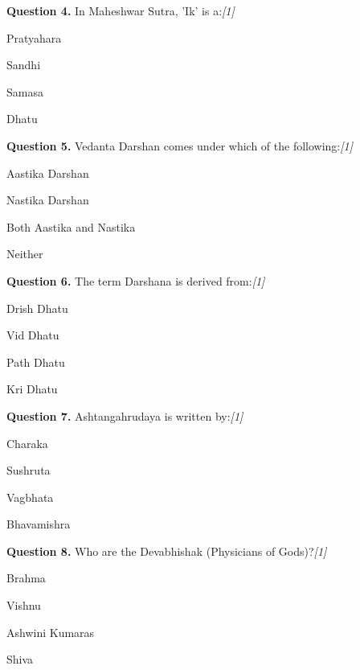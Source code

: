 \documentclass[11pt,a4paper]{article}
\newcommand{\pts}[1]{\hfill   \textit{[#1]}}
\begin{document}
\medskip




\noindent   \textbf{Question 4.} In Maheshwar Sutra, 'Ik' is a:\pts{1}

\begin{parts}
  \item Pratyahara
  \item Sandhi
  \item Samasa
  \item Dhatu
\end{parts}

\medskip




\noindent   \textbf{Question 5.} Vedanta Darshan comes under which of the following:\pts{1}

\begin{parts}
  \item Aastika Darshan
  \item Nastika Darshan
  \item Both Aastika and Nastika
  \item Neither
\end{parts}

\medskip




\noindent   \textbf{Question 6.} The term Darshana is derived from:\pts{1}

\begin{parts}
  \item Drish Dhatu
  \item Vid Dhatu
  \item Path Dhatu
  \item Kri Dhatu
\end{parts}

\medskip




\noindent   \textbf{Question 7.} Ashtangahrudaya is written by:\pts{1}

\begin{parts}
  \item Charaka
  \item Sushruta
  \item Vagbhata
  \item Bhavamishra
\end{parts}

\medskip




\noindent   \textbf{Question 8.} Who are the Devabhishak (Physicians of Gods)?\pts{1}

\begin{parts}
  \item Brahma
  \item Vishnu
  \item Ashwini Kumaras
  \item Shiva
\end{parts}
\end{document}
